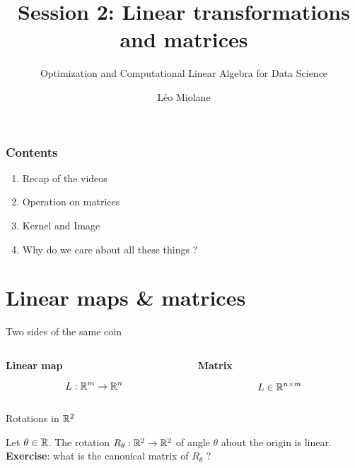 \documentclass{beamer}
\title{Session 2: Linear transformations and matrices}
\subtitle{Optimization and Computational Linear Algebra for Data Science}
\author{Léo Miolane}
\date{}
\begin{document}
\setcounter{showProgressBar}{0}
\setcounter{showSlideNumbers}{0}

\frame{\titlepage}

\begin{frame}
	\frametitle{Contents}
	\begin{enumerate}
		\item Recap of the videos
		\item Operation on matrices
		\item Kernel and Image
		\item Why do we care about all these things ? 
	\end{enumerate}
\end{frame}


\setcounter{framenumber}{0}
\setcounter{showSlideNumbers}{1}

\section{Linear maps \& matrices}

\begin{frame}[t]{Two sides of the same coin}
	\grid
	\begin{columns}
		\hspace{-0.85cm}
		\begin{column}{0.5\textwidth}
			\vspace{-0.5cm}
			\begin{center}
				\bf Linear map
			\end{center}
			$$
			L: \mathbb{R}^m \to \mathbb{R}^n
			$$
			\vspace{6cm}
		\end{column}
		\vrule
		\begin{column}{0.5\textwidth}
			\vspace{-0.5cm}
			\begin{center}
				\bf Matrix
			\end{center}
			$$
			L \in \mathbb{R}^{n \times m}
			$$
			\vspace{6cm}
		\end{column}
	\end{columns}
	\pause
\end{frame}

\begin{frame}[t]{Rotations in $\mathbb{R}^2$}
	\grid

	Let $\theta \in \mathbb{R}$.
	The rotation $R_{\theta}: \mathbb{R}^2 \to \mathbb{R}^2$ of angle $\theta$ about the origin is linear.
	\\
	\vspace{0.3cm}
	\textbf{Exercise}: what is the canonical matrix of $R_{\theta}$ ?
\end{frame}
\end{document}
